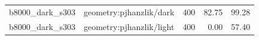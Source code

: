\begin{longtable}{l>{\raggedright\arraybackslash}p{.42\linewidth}rrr}
b8000\_\allowbreak{}dark\_\allowbreak{}s303 & %
geometry:pjhanzlik/dark & %
400 & %
82.75 & %
99.28 \\ %

b8000\_\allowbreak{}dark\_\allowbreak{}s303 & %
geometry:pjhanzlik/light & %
400 & %
0.00 & %
57.40 \\ %


\end{longtable}
